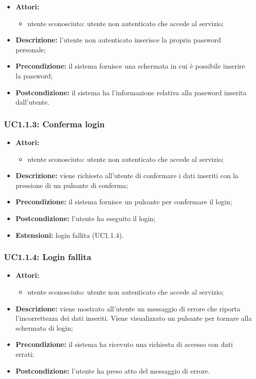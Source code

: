 \begin{itemize}
    \item \textbf{Attori:}
    \begin{itemize}
        \item utente sconosciuto: utente non autenticato che accede al servizio;
    \end{itemize}
    \item \textbf{Descrizione:} l'utente non autenticato inserisce la propria password personale;
    \item \textbf{Precondizione:} il sistema fornisce una schermata in cui è possibile inserire la password;
    \item \textbf{Postcondizione:} il sistema ha l'informazione relativa alla password inserita dall'utente.
\end{itemize}

\subsubsection{UC1.1.3: Conferma login}

\begin{itemize}
    \item \textbf{Attori:}
    \begin{itemize}
        \item utente sconosciuto: utente non autenticato che accede al servizio;
    \end{itemize}
    \item \textbf{Descrizione:} viene richiesto all'utente di confermare i dati inseriti con la pressione di un pulsante di conferma;
    \item \textbf{Precondizione:} il sistema fornisce un pulsante per confermare il login;
    \item \textbf{Postcondizione:} l'utente ha eseguito il login;
    \item \textbf{Estensioni:} login fallita (UC1.1.4).
\end{itemize}

\subsubsection{UC1.1.4: Login fallita}

\begin{itemize}
    \item \textbf{Attori:}
    \begin{itemize}
        \item utente sconosciuto: utente non autenticato che accede al servizio;
    \end{itemize}
    \item \textbf{Descrizione:} viene mostrato all'utente un messaggio di errore che riporta l'incorrettezza dei dati inseriti. Viene visualizzato un pulsante per tornare alla schermata di login;
    \item \textbf{Precondizione:} il sistema ha ricevuto una richiesta di accesso con dati errati;
    \item \textbf{Postcondizione:} l'utente ha preso atto del messaggio di errore.
\end{itemize}

